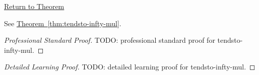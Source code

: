 \newpage
{}
\label{prf:tendsto-infty-mul}

\begin{remark*}[Return]
\hyperref[thm:tendsto-infty-mul]{Return to Theorem}
\end{remark*}

\begin{theorem*}
See \hyperref[thm:tendsto-infty-mul]{Theorem~\ref*{thm:tendsto-infty-mul}}.
\end{theorem*}

\begin{proof}[Professional Standard Proof]
\LRAProofBodyStart
TODO: professional standard proof for tendsto-infty-mul.
\end{proof}

\begin{proof}[Detailed Learning Proof]
\LRAProofBodyStart
TODO: detailed learning proof for tendsto-infty-mul.
\end{proof}

\begin{remark*}
\end{remark*}

\begin{dependencies}
\NoLocalDependencies
\end{dependencies}

\clearpage
